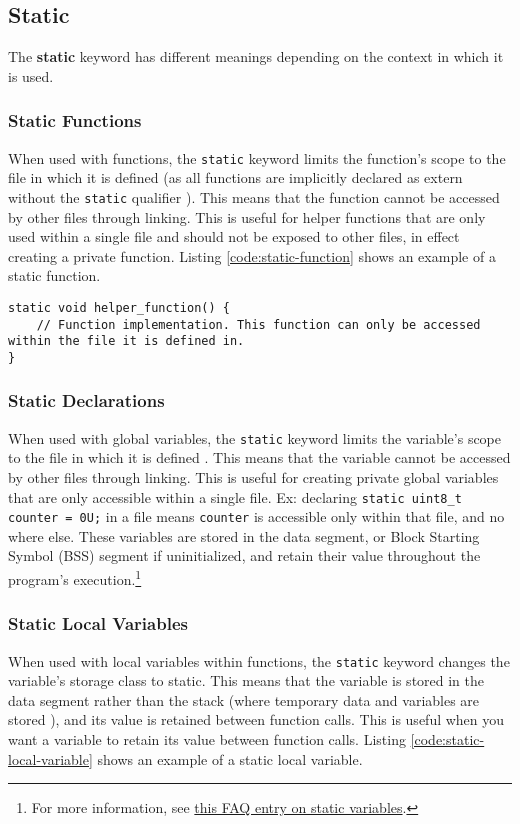 \documentclass[main.tex]{subfiles}
\begin{document}
\subsection{Static}
The \textbf{static} keyword has different meanings depending on the context in which it is used.
\subsubsection{Static Functions}
When used with functions, the \texttt{static} keyword limits the function's scope to the file in which it is defined (as all functions are implicitly declared as extern without the \texttt{static} qualifier \cite{arm_static}). This means that the function cannot be accessed by other files through linking. This is useful for helper functions that are only used within a single file and should not be exposed to other files, in effect creating a private function. Listing \ref{code:static-function} shows an example of a static function.
\newpage

\begin{lstlisting}[caption={Example of a Static Function}, label={code:static-function}]
static void helper_function() {
    // Function implementation. This function can only be accessed within the file it is defined in.
}
\end{lstlisting}

\subsubsection{Static Declarations}
When used with global variables, the \texttt{static} keyword limits the variable's scope to the file in which it is defined \cite{arm_static}. This means that the variable cannot be accessed by other files through linking. This is useful for creating private global variables that are only accessible within a single file. Ex: declaring \texttt{static uint8\_t counter = 0U;} in a file means \texttt{counter} is accessible only within that file, and no where else. These variables are stored in the data segment, or Block Starting Symbol (BSS) segment if uninitialized, and retain their value throughout the program's execution.\footnote{For more information, see \href{https://cosmic-software.com/faq/faq17.php}{this FAQ entry on static variables}.}


\subsubsection{Static Local Variables}
When used with local variables within functions, the \texttt{static} keyword changes the variable's storage class to static. This means that the variable is stored in the data segment rather than the stack (where temporary data and variables are stored \cite{embedded_com_Static}), and its value is retained between function calls. This is useful when you want a variable to retain its value between function calls. Listing \ref{code:static-local-variable} shows an example of a static local variable.


\end{document}
